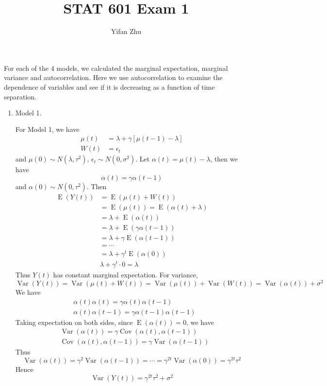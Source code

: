 \documentclass{article}
\DeclareMathOperator{\Cov}{Cov}
\DeclareMathOperator{\Var}{Var}
\DeclareMathOperator{\E}{E}
\begin{document}
	

	
	\title{STAT 601 Exam 1}
	\author{Yifan Zhu}
	\maketitle
For each of the 4 models, we calculated the marginal expectation, marginal variance and autocorrelation. Here we use autocorrelation to examine the dependence of variables and see if it is decreasing as a function of time separation.
\begin{enumerate}
	\item Model 1.

	For Model 1, we have
	\begin{align*}
	\mu(t) & = \lambda + \gamma[\mu(t-1) - \lambda]\\
	W(t) & = \epsilon_t
	\end{align*}
	and $\mu(0) \sim N(\lambda, \tau^2),\, \epsilon_t \sim N(0, \sigma^2)$.
	Let $\alpha(t) = \mu(t) - \lambda$, then we have
	\[\alpha(t) = \gamma \alpha(t-1)\]
	and $\alpha(0) \sim N(0, \tau^2)$. Then
	\begin{align*}
	\E(Y(t)) &= \E(\mu(t) + W(t)) \\
	&= \E(\mu(t)) = \E(\alpha(t) + \lambda) \\
	&= \lambda + \E(\alpha(t)) \\
	&= \lambda + \E(\gamma \alpha(t-1)) \\
	& = \lambda + \gamma \E(\alpha(t-1))\\
	&= \cdots \\
	&= \lambda + \gamma^t \E(\alpha(0)) \\
	& \lambda + \gamma^t \cdot 0 = \lambda
	\end{align*}
	Thus $Y(t)$ has constant marginal expectation.
	For variance, 
	\[\Var(Y(t)) = \Var(\mu(t) + W(t)) = \Var(\mu(t)) + \Var(W(t)) = \Var(\alpha(t)) + \sigma^2\]
	We have
	\begin{align*}
	&\alpha(t) \alpha(t) = \gamma\alpha(t)\alpha(t-1)\\
	&\alpha(t) \alpha(t-1) = \gamma\alpha(t-1)\alpha(t-1)
	\end{align*}
	Taking expectation on both sides, since $\E(\alpha(t)) = 0$, we have
    \begin{align*}
    &\Var(\alpha(t)) = \gamma \Cov(\alpha(t), \alpha(t-1))\\
    &\Cov(\alpha(t), \alpha(t-1)) = \gamma \Var(\alpha(t-1))
    \end{align*}
    Thus
    \[\Var(\alpha(t)) = \gamma^2 \Var(\alpha(t-1)) = \cdots = \gamma^{2t} \Var(\alpha(0)) = \gamma^{2t} \tau^2\]
    Hence
    \[\Var(Y(t)) = \gamma^{2t} \tau^2 + \sigma^2\]


\end{enumerate}
\end{document}

